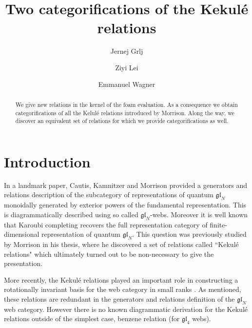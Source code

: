 \documentclass[12pt]{amsart}
\title{Two categorifications of the Kekulé relations}
\theoremstyle{definition}
\theoremstyle{remark}
\numberwithin{equation}{section}
\numberwithin{figure}{section}
\newcommand{\GL}{\mathfrak{gl}}
\begin{document}
\author[J.~Grlj]{Jernej Grlj}
\address{Department of Mathematics\\
 University of Southern California \\
  Los Angeles, California 90089, USA}
  
\author[Z.~Lei]{Ziyi Lei}
\address{School of Mathematical Sciences \\
Beijing Normal University \\
Beijing 100875, China}

\author[E.~Wagner]{Emmanuel Wagner}
\address{Université Paris Cité, IMJ-PRG \\
Université Paris Sorbonne, UMR 7586 CNRS \\
F-75013 Paris, France}



\begin{abstract}
We give new relations in the kernel of the foam evaluation. As a consequence we obtain categorifications of all the Kelul\'e relations introduced by Morrison. Along the way, we discover an equivalent set of relations for which we provide categorifications as well.
\end{abstract}

\maketitle

\section{Introduction}
In a landmark paper, Cautis, Kamnitzer and Morrison \cite{CKM2014} provided a generators and relations description of the subcategory of representations of quantum $\GL_N$ monoidally generated by exterior powers of the fundamental representation. This is diagrammatically described using so called $\GL_N$-webs. Moreover it is well known that Karoubi completing recovers the full representation category of finite-dimensional representation of quantum $\GL_N$. This question was previously studied by Morrison \cite{Mor2007} in his thesis, where he discovered a set of relations called ``Kekulé relations" which ultimately turned out to be non-necessary to give the presentation.

More recently, the Kekulé relations played an important role in constructing a rotationally invariant basis for the web category in small ranks \cite{Kup1996,SL4Basis}. As mentioned, these relations are redundant in the generators and relations definition of the $\GL_N$ web category. However there is no known diagrammatic derivation for the Kekulé relations outside of the simplest case, benzene relation (for $\GL_4$ webs).
\end{document}
